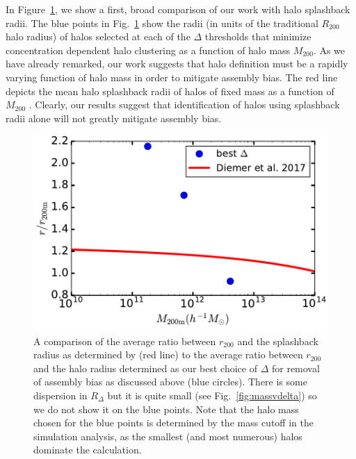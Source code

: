 \documentclass[usenatbib,fleqn]{mnras}
\begin{document}
In Figure~\ref{fig:splashback_compare}, we show a first, broad comparison of our work with halo splashback radii. The blue points in Fig.~\ref{fig:splashback_compare} show the radii (in units of the traditional $R_{200}$ halo radius) of halos selected at each of the $\Delta$ thresholds that minimize concentration dependent halo clustering as a function of halo mass $M_{200}$. As we have already remarked, our work suggests that halo definition must be a rapidly varying function of halo mass in order to mitigate assembly bias. The red line depicts the mean halo splashback radii of halos of fixed mass as a function of $M_{200}$ \citep[from][]{diemer_etal17}. Clearly, our results suggest that identification of halos using splashback radii alone will not greatly mitigate assembly bias. 

\begin{figure}
	\centering
	\includegraphics[width=\columnwidth]{test_splashback.pdf}
	\caption{A comparison of the average ratio between $r_{200}$ and the splashback radius as determined by \citet{diemer_etal17} (red line) to the average ratio between $r_{200}$ and the halo radius determined as our best choice of $\Delta$ for removal of assembly bias as discussed above (blue circles). There is some dispersion in $R_{\Delta}$ but it is quite small (see Fig.~\ref{fig:massvdelta}) so we do not show it on the blue points. Note that the halo mass chosen for the blue points is determined by the mass cutoff in the simulation analysis, as the smallest (and most numerous) halos dominate the calculation. 
}
	\label{fig:splashback_compare}
\end{figure}
\end{document}
